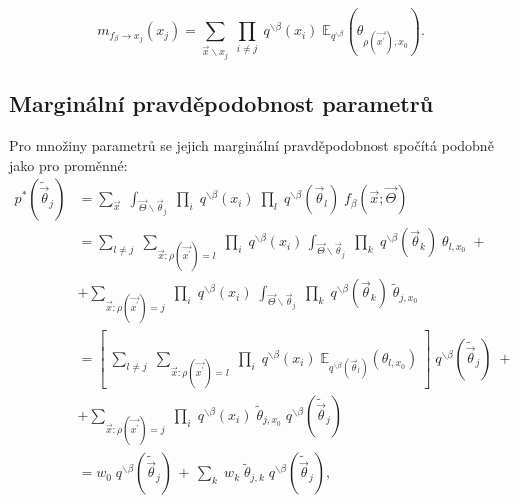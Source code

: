 \begin{equation}
m_{f_\beta \rightarrow x_j}(x_j) =
    \sum_{\vec{x} \backslash x_j} \;
        \prod_{i \ne j}\;
            q^{\backslash \beta}(x_i)\;
            \mathbb{E}_{q^{\backslash \beta}}
                (\theta_{\rho(\vec{x^\prime}), x_0}).
\label{eq:msgfromftox}
\end{equation}

\subsection{Marginální pravděpodobnost parametrů}

Pro množiny parametrů se jejich marginální pravděpodobnost spočítá podobně jako
pro proměnné:
\begin{align}
p^*(\tilde{\vec{\theta}}_j) & = 
    \sum_{\vec{x}} \; 
    \int_{\vec{\Theta} \backslash \vec{\theta}_j} \;
         \prod_i \;
             q^{\backslash \beta}(x_i) \;
         \prod_l \;
    q^{\backslash \beta}(\vec{\theta}_l) \;
    f_\beta(\vec{x}; \vec{\Theta}) \label{eq:ep:theta_1}
\\
& = 
    \sum_{l \ne j} \;
        \sum_{\vec{x}: \rho(\vec{x^\prime}) = l} \;
            \prod_i \;
                q^{\backslash \beta}(x_i) \,
                \int_{\vec{\Theta} \backslash \vec{\theta}_j} \;
                    \prod_k \;
                        q^{\backslash \beta}(\vec{\theta}_k) \;
                        \theta_{l, x_0}\; + \label{eq:ep:theta_2}
\\
& + 
    \sum_{\vec{x}: \rho(\vec{x^\prime}) = j} \;
        \prod_i \;
            q^{\backslash \beta}(x_i) \;
            \int_{\vec{\Theta} \backslash \vec{\theta}_j} \;
                \prod_k \;
                    q^{\backslash \beta}(\vec{\theta}_k) \; 
                    \tilde{\theta}_{j, x_0}
\nonumber
\\
& = 
    \left[ \;
        \sum_{l \ne j} \;
            \sum_{\vec{x}: \rho(\vec{x^\prime}) = l} \;
                \prod_i \;
                    q^{\backslash \beta}(x_i) \;
                    \mathbb{E}_{q^{\backslash \beta}(\vec{\theta}_l)} (\theta_{l, x_0}) \;
    \right] \;
    q^{\backslash \beta}(\tilde{\vec{\theta}}_j) \; + \label{eq:ep:theta_3}
\\
& + 
    \sum_{\vec{x}: \rho(\vec{x^\prime}) = j} \;
        \prod_i \;
            q^{\backslash \beta}(x_i) \;
            \tilde{\theta}_{j,x_0} \;
            q^{\backslash \beta}(\tilde{\vec{\theta}}_j) \;
\label{eq:ep:theta_4}
\nonumber
\\
& = w_0 \; q^{\backslash \beta}(\tilde{\vec{\theta}}_j) \, + \, \sum_k \; w_k \;
    \tilde{\theta}_{j,k} \; q^{\backslash \beta}(\tilde{\vec{\theta}}_j),
\end{align}

